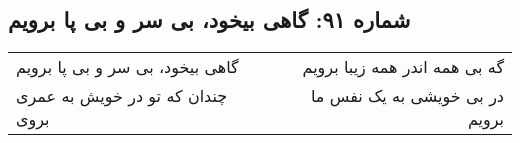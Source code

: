 \begin{center}
\section*{شماره ۹۱: گاهی بیخود، بی سر و بی پا برویم}
\label{sec:091}
\begin{longtable}{l p{0.5cm} r}
گاهی بیخود، بی سر و بی پا برویم
&&
گه بی همه اندر همه زیبا برویم
\\
چندان که تو در خویش به عمری بروی
&&
در بی خویشی به یک نفس ما برویم
\\
\end{longtable}
\end{center}
